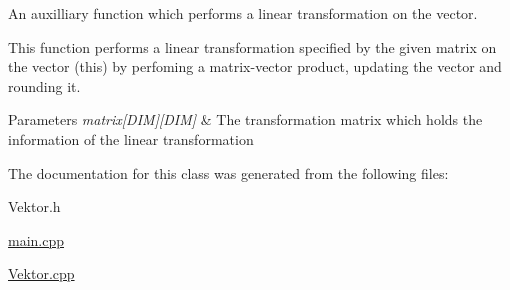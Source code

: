 An auxilliary function which performs a linear transformation on the vector. 

This function performs a linear transformation specified by the given matrix on the vector (this) by perfoming a matrix-\/vector product, updating the vector and rounding it.


\begin{DoxyParams}{Parameters}
{\em matrix\mbox{[}\+D\+I\+M\mbox{]}\mbox{[}\+D\+I\+M\mbox{]}} & The transformation matrix which holds the information of the linear transformation \\
\hline
\end{DoxyParams}


The documentation for this class was generated from the following files\+:\begin{DoxyCompactItemize}
\item 
Vektor.\+h\item 
\hyperlink{main_8cpp}{main.\+cpp}\item 
\hyperlink{_vektor_8cpp}{Vektor.\+cpp}\end{DoxyCompactItemize}
